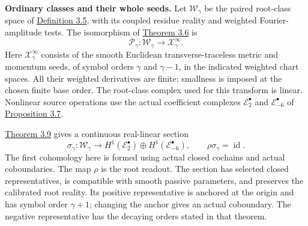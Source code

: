 \documentclass[
  english,
  11pt,
  reqno]{amsart}
\makeatletter
\newcommand{\paperleadspace}{%
  \par\if@nobreak\else
    \addpenalty{\@secpenalty}\addvspace{.5\baselineskip}%
  \fi}
\newcommand{\paperleadin}[1]{%
  \ifvmode\paperleadspace\fi
  \textbf{#1}}
\makeatother
\begin{document}
\paperleadin{Ordinary classes and their whole seeds.} Let
\(\mathscr W_\gamma\) be the paired root-class space of
\hyperref[def:online-weighted-root-domain]{Definition 3.5}, with its
coupled residue reality and weighted Fourier-amplitude tests. The
isomorphism of \hyperref[thm:online-root-seed-isomorphism]{Theorem 3.6}
is%
 \[
\mathscr P_\gamma:\mathscr W_\gamma
\longrightarrow\mathcal X^\infty_\gamma.
\] Here \(\mathcal X^\infty_\gamma\) consists of the smooth Euclidean
transverse-traceless metric and momentum seeds, of symbol orders
\(\gamma\) and \(\gamma-1\), in the indicated weighted chart spaces. All
their weighted derivatives are finite; smallness is imposed at the
chosen finite base order. The root-class complex used for this transform
is linear. Nonlinear source operations use the actual coefficient
complexes \(\mathscr E_2^\bullet\) and \(\mathscr E_{-6}^\bullet\) of
\hyperref[prop:online-actual-coefficient-exact-sequence]{Proposition
3.7}.

\hyperref[thm:online-canonical-actual-pair-lift]{Theorem 3.9} gives a
continuous real-linear section%
 \[
\sigma_\gamma:\mathscr W_\gamma
\longrightarrow
H^1(\mathscr E_2^\bullet)\oplus
H^1(\mathscr E_{-6}^\bullet),
\qquad
\rho\sigma_\gamma=\operatorname{id}.
\] The first cohomology here is formed using actual closed cochains and
actual coboundaries. The map \(\rho\) is the root readout. The section
has selected closed representatives, is compatible with smooth passive
parameters, and preserves the calibrated root reality. Its positive
representative is anchored at the origin and has symbol order
\(\gamma+1\); changing the anchor gives an actual coboundary. The
negative representative has the decaying orders stated in that theorem.
\end{document}
